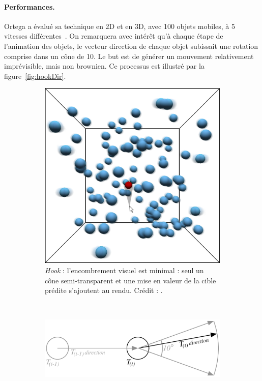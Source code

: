 	\paragraph{Performances.}
	Ortega a évalué sa technique en 2D et en 3D, avec 100 objets mobiles, à 5 vitesses différentes~\cite{ortega2013hook}. On remarquera avec intérêt qu'à chaque étape de l'animation des objets, le vecteur direction de chaque objet subissait une rotation comprise dans un cône de 10\textdegree. Le but est de générer un mouvement relativement imprévisible, mais non brownien. Ce processus est illustré par la figure~\ref{fig:hookDir}.
	
	\begin{figure}[!htb]
		\begin{subfigure}{.29\textwidth}
			\centering
			\includegraphics[width=\textwidth]{figures/ch2/hookPic}
			\caption[\emph{Hook} -- fonctionnement]{\emph{Hook} : l'encombrement visuel est minimal : seul un cône semi-transparent et une mise en valeur de la cible prédite s'ajoutent au rendu. Crédit : \cite{ortega2013hook}.}
			\label{fig:hookPic}
		\end{subfigure}
		~
		\begin{subfigure}{.69\textwidth}
			\centering
			\includegraphics[width=\textwidth]{figures/ch2/hookDir}

\end{subfigure}
\end{figure}
